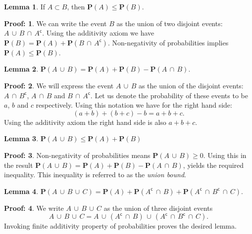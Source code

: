 \documentclass[11pt]{amsart}
\theoremstyle{definition} \newtheorem{thm}{Theorem:} \theoremstyle{plain}
\theoremstyle{definition} \newtheorem*{nnthm}{Theorem:} \theoremstyle{plain}
\theoremstyle{definition} \newtheorem{lem}{Lemma} \theoremstyle{plain}
\theoremstyle{definition} \newtheorem*{nnlem}{Lemma:} \theoremstyle{plain}
\theoremstyle{definition} \newtheorem{prf}{Proof:} \theoremstyle{plain}
\theoremstyle{definition} \newtheorem*{nnprf}{Proof:} \theoremstyle{plain}
\theoremstyle{definition} \newtheorem{eg}{Example:} \theoremstyle{plain}
\theoremstyle{definition} \newtheorem*{sol}{Solution:} \theoremstyle{plain}
\newcommand{\setcomp}[1]{{#1}^{\mathsf{c}}}
\newcommand{\prob}[1]{\mathbf{P}(#1)}
\newcommand{\twocup}[2]{{#1} \,\cup\, {#2}}
\newcommand{\threecup}[3]{{#1} \,\cup\, {#2} \,\cup\, {#3}}
\newcommand{\twocap}[2]{{#1} \,\cap\, {#2}}
\newcommand{\threecap}[3]{{#1} \,\cap\, {#2} \,\cap\, {#3}}
\begin{document}
\begin{lem}
If $A \subset B$, then $\prob{A} \leq \prob{B}$.
\end{lem}
\begin{nnprf}
We can write the event $B$ as the union of two disjoint events: 
$\twocup{A}{\twocap{B}{\setcomp{A}}}$. Using the additivity axiom we have
$\prob{B} = \prob{A} + \prob{\twocap{B}{\setcomp{A}}}$. Non-negativity of 
probabilities implies $\prob{A} \leq \prob{B}$. 
\end{nnprf}

\begin{lem}
$\prob{\twocup{A}{B}} = \prob{A} + \prob{B} - \prob{\twocap{A}{B}}$.
\end{lem}
\begin{nnprf}
We will express the event $\twocup{A}{B}$ as the union of the disjoint events: 
$\twocap{A}{\setcomp{B}}$, $\twocap{A}{B}$ and $\twocap{B}{\setcomp{A}}$. Let 
us denote the probability of these events to be $a$, $b$ and $c$ respectively. 
Using this notation we have for the right hand side:
\begin{equation*}
(a + b) + (b + c) - b = a + b + c.
\end{equation*}
Using the additivity axiom the right hand side is also $a + b + c$. 
\end{nnprf}

\begin{lem}
$\prob{\twocup{A}{B}} \leq \prob{A} + \prob{B}$
\end{lem}
\begin{nnprf}
Non-negativity of probabilities means $\prob{\twocup{A}{B}} \geq 0$. Using this 
in the result 
$\prob{\twocup{A}{B}} = \prob{A} + \prob{B} - \prob{\twocap{A}{B}}$, yields the 
required inequality. This inequality is referred to as the \emph{union bound}.
\end{nnprf}

\begin{lem}
$
\prob{\threecup{A}{B}{C}} = \prob{A} + \prob{\twocap{\setcomp{A}}{B}} + 
\prob{\threecap{\setcomp{A}}{\setcomp{B}}{C}}$.
\end{lem}
\begin{nnprf}
We write $\threecup{A}{B}{C}$ as the union of three disjoint events 
\begin{equation*}
\threecup{A}{B}{C} = 
\threecup{A}{(\twocap{\setcomp{A}}{B})}{(\threecap{\setcomp{A}}{\setcomp{B}}{C})}.
\end{equation*}
Invoking finite additivity property of probabilities proves the desired lemma. 
\end{nnprf}
\end{document}
